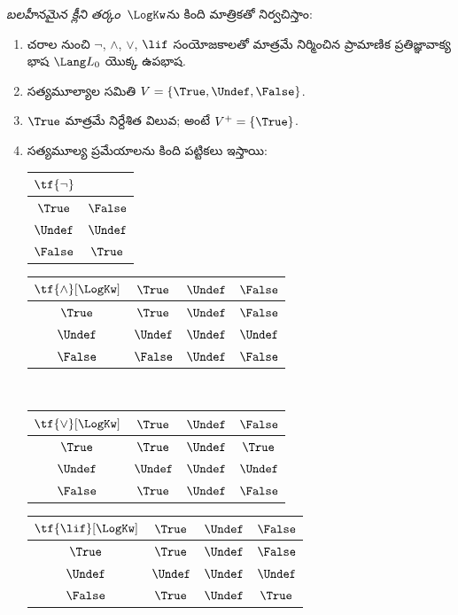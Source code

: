 \documentclass[../../../include/open-logic-section]{subfiles}
\begin{document}
\begin{defn}
\emph{బలహీనమైన క్లీని తర్కం}~$\LogKw$ను కింది మాత్రికతో
నిర్వచిస్తాం:
\begin{enumerate}
  \item చరాల నుంచి $\lnot$, $\land$, $\lor$, $\lif$
  సంయోజకాలతో మాత్రమే నిర్మించిన ప్రామాణిక
  ప్రతిజ్ఞావాక్య భాష $\Lang L_0$ యొక్క ఉపభాష.
  \item సత్యమూల్యాల సమితి $V = \{\True, \Undef, \False\}$.
  \item $\True$ మాత్రమే నిర్దేశిత విలువ; అంటే
  $V^+ = \{\True\}$.
  \item సత్యమూల్య ప్రమేయాలను కింది పట్టికలు ఇస్తాయి:
  \begin{center}
    \begin{tabular}{c|c}
      $\tf{\lnot}$ & \\
      \hline
      $\True$ & $\False$ \\
      $\Undef$ & $\Undef$ \\
      $\False$ & $\True$
    \end{tabular}
    \quad
    \begin{tabular}{c|ccc}
      $\tf{\land}[\LogKw]$ & $\True$ & $\Undef$ & $\False$ \\
      \hline
      $\True$ & $\True$ & $\Undef$ & $\False$ \\
      $\Undef$ & $\Undef$ & $\Undef$ & $\Undef$\\
      $\False$ & $\False$ & $\Undef$ & $\False$
    \end{tabular}
    \\[2ex]
    \begin{tabular}{c|ccc}
      $\tf{\lor}[\LogKw]$ & $\True$ & $\Undef$ & $\False$ \\
      \hline
      $\True$ & $\True$ & $\Undef$ & $\True$ \\
      $\Undef$ & $\Undef$ & $\Undef$ & $\Undef$ \\
      $\False$ & $\True$ & $\Undef$ & $\False$
    \end{tabular}
    \quad
    \begin{tabular}{c|ccc}
      $\tf{\lif}[\LogKw]$ & $\True$ & $\Undef$ & $\False$ \\
      \hline
      $\True$ & $\True$ & $\Undef$ & $\False$ \\
      $\Undef$ & $\Undef$ & $\Undef$ & $\Undef$  \\
      $\False$ & $\True$ & $\Undef$ & $\True$
    \end{tabular}
  \end{center}
\end{enumerate}
\end{defn}
\end{document}
